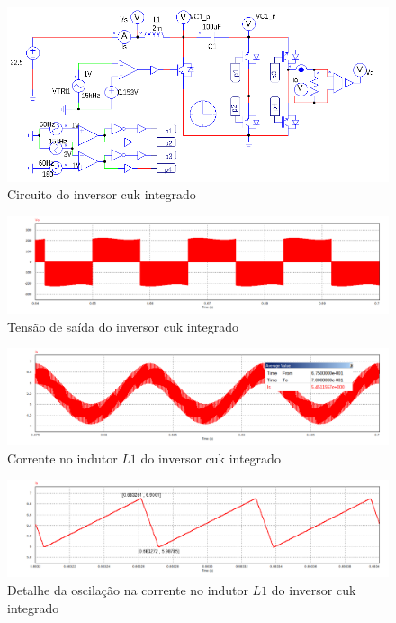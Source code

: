 \documentclass[
	12pt,				%
	openright,			%
	twoside,			%
	a4paper,			%
	english,			%
	french,				%
	spanish,			%
	brazil,				%
	]{abntex2}
\begin{document}
\begin{figure}[htbp]%
	\begin{center}%
		\includegraphics[width= \linewidth]{integ_cuk_circ_psim}
		\caption{Circuito do inversor cuk integrado}
		\label{fig:integ_cuk_met}
	\end{center}
\end{figure}

\begin{figure}[htb]%
	\centering
		\includegraphics[width= \linewidth]{cuk_integ_Vout}
		\caption{Tensão de saída do inversor cuk integrado}
		\label{fig:cuk_integ_ripp_V_out}
\end{figure}

\begin{figure}[htb]%
	\centering
		\includegraphics[width= \linewidth]{cuk_integ_IL1}
		\caption{Corrente no indutor $L1$ do inversor cuk integrado}
		\label{fig:cuk_integ_I_L1}
\end{figure}

\begin{figure}[htb]%
	\centering
		\includegraphics[width= \linewidth]{cuk_integ_ripp_IL1}
		\caption{Detalhe da oscilação na corrente no indutor $L1$ do inversor cuk integrado}
		\label{fig:cuk_integ_ripp_I_L1}
\end{figure}
\end{document}
